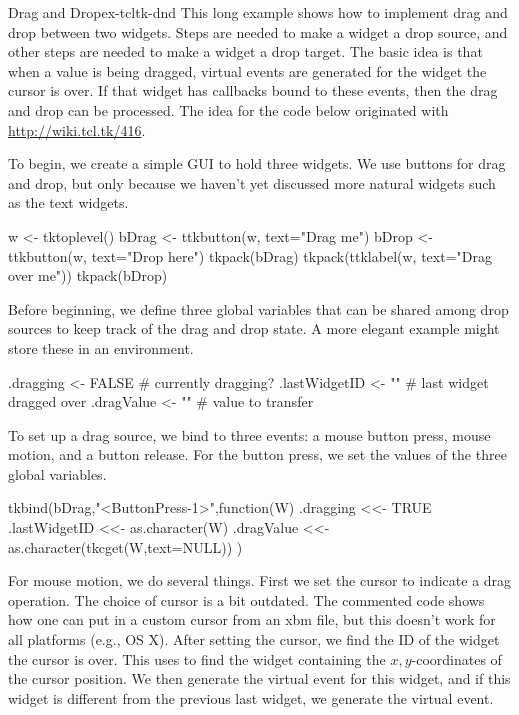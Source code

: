 \begin{example}{Drag and Drop}{ex-tcltk-dnd}
This long example shows how to implement drag and drop between two
widgets. Steps are needed to make a widget a drop source, and other
steps are needed to make a widget a drop target. The basic idea is
that when a value is being dragged, virtual events are generated for
the widget the cursor is over. If that widget has callbacks bound to
these events, then the drag and drop can be processed. The idea for
the code below originated with \url{http://wiki.tcl.tk/416}.


To begin, we create a simple GUI to hold three widgets. We use buttons
for drag and drop, but only because we haven't yet discussed more
natural widgets such as the text widgets. 

\begin{Schunk}
\begin{Sinput}
 w <- tktoplevel()
 bDrag <- ttkbutton(w, text="Drag me")
 bDrop <- ttkbutton(w, text="Drop here")
 tkpack(bDrag)
 tkpack(ttklabel(w, text="Drag over me"))
 tkpack(bDrop)
\end{Sinput}
\end{Schunk}


Before beginning, we define three global variables that can be shared
among drop sources to keep track of the drag and drop state. A more
elegant example might store these in an environment.
\begin{Schunk}
\begin{Sinput}
 .dragging <- FALSE                 # currently dragging?
 .lastWidgetID <- ""                # last widget dragged over
 .dragValue <- ""                   # value to transfer
\end{Sinput}
\end{Schunk}


To set up a drag source, we bind to three events: a mouse button press, mouse motion, and a button release. For the button press, we set the values of the three global variables.
\begin{Schunk}
\begin{Sinput}
 tkbind(bDrag,"<ButtonPress-1>",function(W) {
   .dragging <<-  TRUE
   .lastWidgetID <<- as.character(W)
   .dragValue <<- as.character(tkcget(W,text=NULL))
 })
\end{Sinput}
\end{Schunk}


For mouse motion, we do several things. First we set the cursor to
indicate a drag operation. The choice of cursor is a bit outdated. The
commented code shows how one can put in a custom cursor from an xbm
file, but this doesn't work for all platforms (e.g.,  OS X). After setting the cursor, we find the ID of the widget the cursor is over. This uses  to find the widget containing the $x,y$-coordinates of the cursor position.  We then generate the  virtual event for this widget, and if this widget is different from the previous last widget, we generate the  virtual event.


\end{example}
